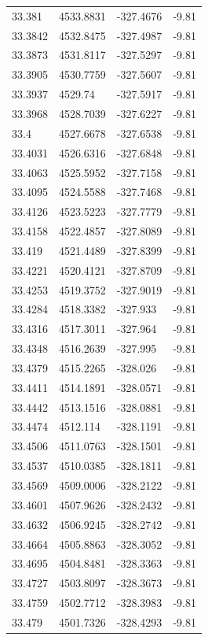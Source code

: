 \begin{table}[H]
\begin{tabular}{llll}
33.381 & 4533.8831 & -327.4676 & -9.81 \\
33.3842 & 4532.8475 & -327.4987 & -9.81 \\
33.3873 & 4531.8117 & -327.5297 & -9.81 \\
33.3905 & 4530.7759 & -327.5607 & -9.81 \\
33.3937 & 4529.74 & -327.5917 & -9.81 \\
33.3968 & 4528.7039 & -327.6227 & -9.81 \\
33.4 & 4527.6678 & -327.6538 & -9.81 \\
33.4031 & 4526.6316 & -327.6848 & -9.81 \\
33.4063 & 4525.5952 & -327.7158 & -9.81 \\
33.4095 & 4524.5588 & -327.7468 & -9.81 \\
33.4126 & 4523.5223 & -327.7779 & -9.81 \\
33.4158 & 4522.4857 & -327.8089 & -9.81 \\
33.419 & 4521.4489 & -327.8399 & -9.81 \\
33.4221 & 4520.4121 & -327.8709 & -9.81 \\
33.4253 & 4519.3752 & -327.9019 & -9.81 \\
33.4284 & 4518.3382 & -327.933 & -9.81 \\
33.4316 & 4517.3011 & -327.964 & -9.81 \\
33.4348 & 4516.2639 & -327.995 & -9.81 \\
33.4379 & 4515.2265 & -328.026 & -9.81 \\
33.4411 & 4514.1891 & -328.0571 & -9.81 \\
33.4442 & 4513.1516 & -328.0881 & -9.81 \\
33.4474 & 4512.114 & -328.1191 & -9.81 \\
33.4506 & 4511.0763 & -328.1501 & -9.81 \\
33.4537 & 4510.0385 & -328.1811 & -9.81 \\
33.4569 & 4509.0006 & -328.2122 & -9.81 \\
33.4601 & 4507.9626 & -328.2432 & -9.81 \\
33.4632 & 4506.9245 & -328.2742 & -9.81 \\
33.4664 & 4505.8863 & -328.3052 & -9.81 \\
33.4695 & 4504.8481 & -328.3363 & -9.81 \\
33.4727 & 4503.8097 & -328.3673 & -9.81 \\
33.4759 & 4502.7712 & -328.3983 & -9.81 \\
33.479 & 4501.7326 & -328.4293 & -9.81 \\

\end{tabular}
\end{table}

